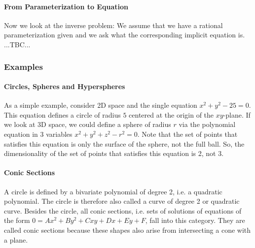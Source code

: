 


\paragraph{From Parameterization to Equation}
Now we look at the inverse problem: We assume that we have a rational parameterization given and we ask what the corresponding implicit equation is. ...TBC...








\subsubsection{Examples}

\paragraph{Circles, Spheres and Hyperspheres}
As a simple example, consider 2D space and the single equation $x^2 + y^2 - 25 = 0$. This equation defines a circle of radius $5$ centered at the origin of the $xy$-plane. If we look at 3D space, we could define a sphere of radius $r$ via the polynomial equation in 3 variables $x^2 + y^2 + z^2 - r^2 = 0$. Note that the set of points that satisfies this equation is only the surface of the sphere, not the full ball. So, the dimensionality of the set of points that satisfies this equation is 2, not 3. 

\paragraph{Conic Sections}
A circle is defined by a bivariate polynomial of degree 2, i.e. a quadratic polynomial. The circle is therefore also called a curve of degree 2 or quadratic curve. Besides the circle, all conic sections, i.e. sets of solutions of equations of the form $0 = A x^2 + B y^2 + C x y + D x + E y + F$, fall into this category. They are called conic sections because these shapes also arise from intersecting a cone with a plane.

